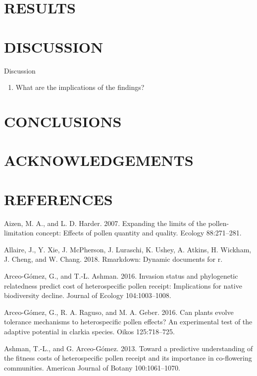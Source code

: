 \documentclass[11pt,a4paper]{article}
\providecommand{\tightlist}{%
  \setlength{\itemsep}{0pt}\setlength{\parskip}{0pt}}
\begin{document}
\section{RESULTS}\label{results}

\section{DISCUSSION}\label{discussion}

Discussion

\begin{enumerate}
\def\labelenumi{\arabic{enumi}.}
\tightlist
\item
  What are the implications of the findings?
\end{enumerate}

\section{CONCLUSIONS}\label{conclusions}

\section{ACKNOWLEDGEMENTS}\label{acknowledgements}

\section{REFERENCES}\label{references}

\hypertarget{refs}{}
\hypertarget{ref-aizen2007}{}
Aizen, M. A., and L. D. Harder. 2007. Expanding the limits of the
pollen-limitation concept: Effects of pollen quantity and quality.
Ecology 88:271--281.

\hypertarget{ref-Allaire_2018}{}
Allaire, J., Y. Xie, J. McPherson, J. Luraschi, K. Ushey, A. Atkins, H.
Wickham, J. Cheng, and W. Chang. 2018. Rmarkdown: Dynamic documents for
r.

\hypertarget{ref-arceo2016}{}
Arceo-Gómez, G., and T.-L. Ashman. 2016. Invasion status and
phylogenetic relatedness predict cost of heterospecific pollen receipt:
Implications for native biodiversity decline. Journal of Ecology
104:1003--1008.

\hypertarget{ref-arceo2016can}{}
Arceo-Gómez, G., R. A. Raguso, and M. A. Geber. 2016. Can plants evolve
tolerance mechanisms to heterospecific pollen effects? An experimental
test of the adaptive potential in clarkia species. Oikos 125:718--725.

\hypertarget{ref-ashman2013}{}
Ashman, T.-L., and G. Arceo-Gómez. 2013. Toward a predictive
understanding of the fitness costs of heterospecific pollen receipt and
its importance in co-flowering communities. American Journal of Botany
100:1061--1070.
\end{document}
